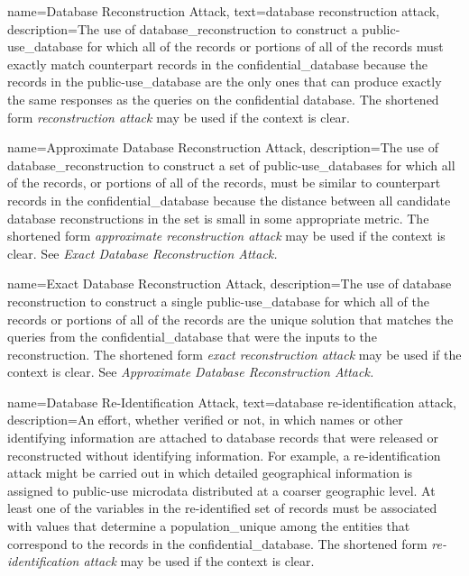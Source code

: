 {
    name=Database Reconstruction Attack,
    text=database reconstruction attack,
    description={The use of \gls{database_reconstruction} to construct a \gls{public-use_database} for which all of the \glspl{record} or portions of all of the records must exactly match counterpart records in the \gls{confidential_database} because the records in the \gls{public-use_database} are the only ones that can produce exactly the same responses as the queries on the confidential database. The shortened form \textit{reconstruction attack} may be used if the context is clear.}
}

{
    name=Approximate Database Reconstruction Attack,
    description={The use of \gls{database_reconstruction} to construct a set of \gls{public-use_database}s for which all of the \glspl{record}, or portions of all of the records, must be similar to counterpart records in the \gls{confidential_database} because the distance between all candidate database reconstructions in the set is small in some appropriate metric. The shortened form \textit{approximate reconstruction attack} may be used if the context is clear. See \emph{Exact Database Reconstruction Attack.}}
}

{
    name=Exact Database Reconstruction Attack,
    description={The use of \gls{database} reconstruction to construct a single \gls{public-use_database} for which all of the \glspl{record} or portions of all of the records are the unique solution that matches the queries from the \gls{confidential_database} that were the inputs to the reconstruction. The shortened form \textit{exact reconstruction attack} may be used if the context is clear. See \emph{Approximate Database Reconstruction Attack.}}
}

{
    name=Database Re-Identification Attack,
    text=database re-identification attack,
    description={An effort, whether verified or not, in which names or other 
    identifying information are attached to \gls{database} \glspl{record} that were released or reconstructed without identifying information. For example, a re-identification attack might be carried out in which detailed geographical information is assigned to public-use microdata distributed at a coarser geographic level.
    At least one of the variables in the re-identified set of records must be associated with values that determine a \gls{population_unique} among the entities that correspond to the records in the \gls{confidential_database}. The shortened form \textit{re-identification attack} may be used if the context is clear.}
}

